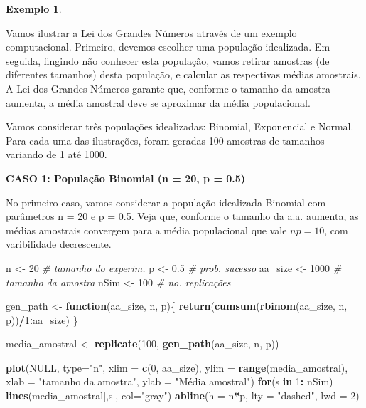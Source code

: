 \documentclass[
]{book}
\newenvironment{Shaded}{\begin{snugshade}}{\end{snugshade}}
\newcommand{\CommentTok}[1]{\textcolor[rgb]{0.56,0.35,0.01}{\textit{#1}}}
\newcommand{\ControlFlowTok}[1]{\textcolor[rgb]{0.13,0.29,0.53}{\textbf{#1}}}
\newcommand{\DataTypeTok}[1]{\textcolor[rgb]{0.13,0.29,0.53}{#1}}
\newcommand{\DecValTok}[1]{\textcolor[rgb]{0.00,0.00,0.81}{#1}}
\newcommand{\FloatTok}[1]{\textcolor[rgb]{0.00,0.00,0.81}{#1}}
\newcommand{\KeywordTok}[1]{\textcolor[rgb]{0.13,0.29,0.53}{\textbf{#1}}}
\newcommand{\NormalTok}[1]{#1}
\newcommand{\OperatorTok}[1]{\textcolor[rgb]{0.81,0.36,0.00}{\textbf{#1}}}
\newcommand{\OtherTok}[1]{\textcolor[rgb]{0.56,0.35,0.01}{#1}}
\newcommand{\StringTok}[1]{\textcolor[rgb]{0.31,0.60,0.02}{#1}}
\theoremstyle{definition}
\theoremstyle{definition}
\newtheorem{example}{Exemplo}[chapter]
\theoremstyle{definition}
\theoremstyle{remark}
\begin{document}
\begin{example}
\protect\hypertarget{exm:unnamed-chunk-9}{}{\label{exm:unnamed-chunk-9} }
\end{example}

Vamos ilustrar a Lei dos Grandes Números através de um exemplo computacional. Primeiro, devemos escolher uma população idealizada. Em seguida, fingindo não conhecer esta população, vamos retirar amostras (de diferentes tamanhos) desta população, e calcular as respectivas médias amostrais. A Lei dos Grandes Números garante que, conforme o tamanho da amostra aumenta, a média amostral deve se aproximar da média populacional.

Vamos considerar três populações idealizadas: Binomial, Exponencial e Normal.
Para cada uma das ilustrações, foram geradas 100 amostras de tamanhos variando de 1 até 1000.

\textbf{CASO 1: População Binomial (n = 20, p = 0.5)}

No primeiro caso, vamos considerar a população idealizada Binomial com parâmetros n = 20 e p = 0.5. Veja que, conforme o tamanho da a.a. aumenta, as médias amostrais convergem para a média populacional que vale \(np = 10\), com varibilidade decrescente.

\begin{Shaded}
\begin{Highlighting}[]
\NormalTok{n       <-}\StringTok{ }\DecValTok{20}     \CommentTok{# tamanho do experim.}
\NormalTok{p       <-}\StringTok{ }\FloatTok{0.5}    \CommentTok{# prob. sucesso}
\NormalTok{aa_size <-}\StringTok{ }\DecValTok{1000}   \CommentTok{# tamanho da amostra}
\NormalTok{nSim    <-}\StringTok{ }\DecValTok{100}    \CommentTok{# no. replicações}

\NormalTok{gen_path <-}\StringTok{ }\ControlFlowTok{function}\NormalTok{(aa_size, n, p)\{}
  \KeywordTok{return}\NormalTok{(}\KeywordTok{cumsum}\NormalTok{(}\KeywordTok{rbinom}\NormalTok{(aa_size, n, p))}\OperatorTok{/}\DecValTok{1}\OperatorTok{:}\NormalTok{aa_size)}
\NormalTok{\}}
  
\NormalTok{media_amostral <-}\StringTok{ }\KeywordTok{replicate}\NormalTok{(}\DecValTok{100}\NormalTok{, }\KeywordTok{gen_path}\NormalTok{(aa_size, n, p))}

\KeywordTok{plot}\NormalTok{(}\OtherTok{NULL}\NormalTok{, }\DataTypeTok{type=}\StringTok{"n"}\NormalTok{, }
     \DataTypeTok{xlim =} \KeywordTok{c}\NormalTok{(}\DecValTok{0}\NormalTok{, aa_size), }
     \DataTypeTok{ylim =} \KeywordTok{range}\NormalTok{(media_amostral),}
     \DataTypeTok{xlab =} \StringTok{"tamanho da amostra"}\NormalTok{,}
     \DataTypeTok{ylab =} \StringTok{"Média amostral"}\NormalTok{)}
\ControlFlowTok{for}\NormalTok{(s }\ControlFlowTok{in} \DecValTok{1}\OperatorTok{:}\StringTok{ }\NormalTok{nSim) }\KeywordTok{lines}\NormalTok{(media_amostral[,s], }\DataTypeTok{col=}\StringTok{"gray"}\NormalTok{)}
\KeywordTok{abline}\NormalTok{(}\DataTypeTok{h =}\NormalTok{ n}\OperatorTok{*}\NormalTok{p, }\DataTypeTok{lty =} \StringTok{"dashed"}\NormalTok{, }\DataTypeTok{lwd =} \DecValTok{2}\NormalTok{)}
\end{Highlighting}
\end{Shaded}
\end{document}
